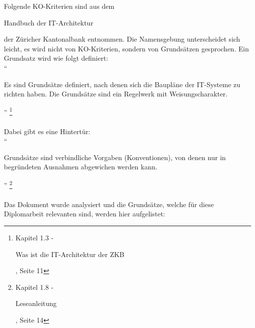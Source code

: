   Folgende KO-Kriterien sind aus dem \begin{itshape}Handbuch der
  IT-Architektur\end{itshape}\cite{ZkbHandbuchDerItArchitektur} der Züricher
  Kantonalbank entnommen. Die Namensgebung unterscheidet sich leicht, es wird
  nicht von KO-Kriterien, sondern von Grundsätzen gesprochen. Ein Grundsatz
  wird wie folgt definiert:\\
  
  ``\begin{itshape}Es sind Grundsätze definiert, nach denen sich die Baupläne
  der IT-Systeme zu richten haben. Die Grundsätze sind ein Regelwerk mit
  Weisungscharakter.\end{itshape}''
  \footnote{\cite{ZkbHandbuchDerItArchitektur} Kapitel 1.3 - \begin{itshape}Was
  ist die IT-Architektur der ZKB\end{itshape}, Seite 11}
  \\
  \\
  \noindent
  Dabei gibt es eine Hintertür:\\

  ``\begin{itshape}Grundsätze sind verbindliche Vorgaben (Konventionen), von
  denen nur in begründeten Ausnahmen abgewichen werden kann.\end{itshape}''
  \footnote{\cite{ZkbHandbuchDerItArchitektur} Kapitel 1.8 -
  \begin{itshape}Leseanleitung\end{itshape}, Seite 14}
  \\
  \\
  \noindent
  Das Dokument wurde analysiert und die Grundsätze, welche für diese
  Diplomarbeit relevanten sind, werden hier aufgelistet:
  
